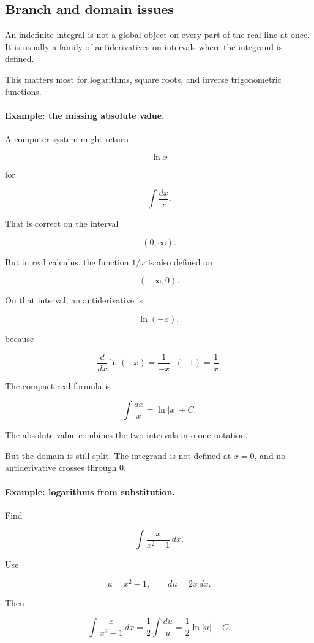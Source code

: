 \subsection{Branch and domain issues}
\label{subsec:branch-domain-issues}

An indefinite integral is not a global object on every part of the real line at once.  It is
usually a family of antiderivatives on intervals where the integrand is defined.

This matters most for logarithms, square roots, and inverse trigonometric functions.

\paragraph{Example: the missing absolute value.}
A computer system might return

\[
\ln x
\]

for

\[
\int \frac{dx}{x}.
\]

That is correct on the interval

\[
(0,\infty).
\]

But in real calculus, the function \(1/x\) is also defined on

\[
(-\infty,0).
\]

On that interval, an antiderivative is

\[
\ln(-x),
\]

because

\[
\frac{d}{dx}\ln(-x)=\frac1{-x}\cdot(-1)=\frac1x.
\]

The compact real formula is

\[
\boxed{
\int \frac{dx}{x}=\ln|x|+C.
}
\]

The absolute value combines the two intervals into one notation.

But the domain is still split.  The integrand is not defined at \(x=0\), and no
antiderivative crosses through \(0\).

\paragraph{Example: logarithms from substitution.}
Find

\[
\int \frac{x}{x^2-1}\,dx.
\]

Use

\[
u=x^2-1,
\qquad
du=2x\,dx.
\]

Then

\[
\int \frac{x}{x^2-1}\,dx
=
\frac12\int \frac{du}{u}
=
\frac12\ln|u|+C.
\]

